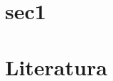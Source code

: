 \documentclass[a4paper,11pt]{article}
\begin{document}
\hypertarget{sec1}{%
	\section{sec1}\label{sec1}}




\paragraph{}
\paragraph{}
\paragraph{}
\paragraph{}





\subsection{}


\subsection{}

\subsection{}




\newpage 

\hypertarget{literatura}{%
\section*{Literatura}\label{literatura}}
\end{document}
